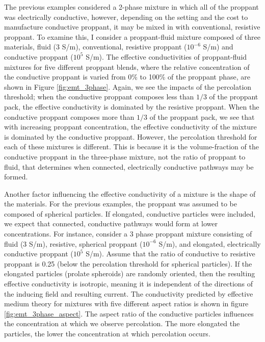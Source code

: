 

The previous examples considered a 2-phase mixture in which all of the proppant was electrically conductive, however, depending on the setting and the cost to manufacture conductive proppant, it may be mixed in with conventional, resistive proppant. To examine this, I consider a proppant-fluid mixture composed of three materials, fluid ($3$ S/m), conventional, resistive proppant ($10^{-6}$ S/m) and conductive proppant ($10^5$ S/m). The effective conductivities of proppant-fluid mixtures for five different proppant blends, where the relative concentration of the conductive proppant is varied from 0\% to 100\% of the proppant phase, are shown in Figure \ref{fig:emt_3phase}. Again, we see the impacts of the percolation threshold; when the conductive proppant composes less than $1/3$ of the proppant pack, the effective conductivity is dominated by the resistive proppant. When the conductive proppant composes more than $1/3$ of the proppant pack, we see that with increasing proppant concentration, the effective conductivity of the mixture is dominated by the conductive proppant. However, the percolation threshold for each of these mixtures is different. This is because it is the volume-fraction of the conductive proppant in the three-phase mixture, not the ratio of proppant to fluid, that determines when connected, electrically conductive pathways may be formed.




Another factor influencing the effective conductivity of a mixture is the shape of the materials. For the previous examples, the proppant was assumed to be composed of spherical particles. If elongated, conductive particles were included, we expect that connected, conductive pathways would form at lower concentrations. For instance, consider a 3 phase proppant mixture consisting of fluid (3 S/m), resistive, spherical proppant ($10^{-6}$ S/m), and elongated, electrically conductive proppant ($10^5$ S/m). Assume that the ratio of conductive to resistive proppant is 0.25 (below the percolation threshold for spherical particles). If the elongated particles (prolate spheroids) are randomly oriented, then the resulting effective conductivity is isotropic, meaning it is independent of the directions of the inducing field and resulting current. The conductivity predicted by effective medium theory for mixtures with five different aspect ratios is shown in figure \ref{fig:emt_3phase_aspect}. The aspect ratio of the conductive particles influences the concentration at which we observe percolation. The more elongated the particles, the lower the concentration at which percolation occurs.

